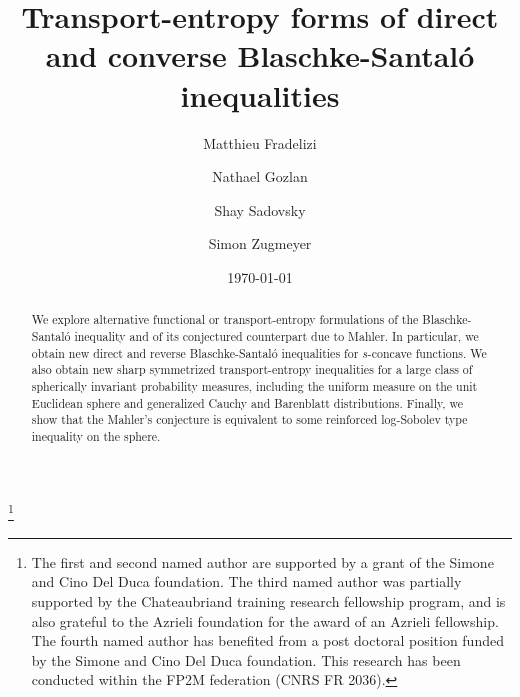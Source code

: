 \documentclass[10pt]{amsart}
\theoremstyle{definition}
\theoremstyle{remark}
\begin{document}
\title{Transport-entropy forms of direct and converse Blaschke-Santal\'o inequalities}

\begin{abstract}
We explore alternative functional or transport-entropy  formulations of the Blaschke-Santal\'o inequality and of its conjectured counterpart due to Mahler. In particular, we obtain new direct and reverse Blaschke-Santal\'o inequalities for $s$-concave functions. We also obtain new sharp symmetrized transport-entropy inequalities for a large class of spherically invariant probability measures, including the uniform measure on the unit Euclidean sphere and generalized Cauchy and Barenblatt distributions. Finally, we show that the Mahler's conjecture is equivalent to some reinforced log-Sobolev type inequality on the sphere.
\end{abstract}

\author{Matthieu Fradelizi}
\address{LAMA, Univ Gustave Eiffel, Univ Paris Est Creteil, CNRS, F-77447 Marne-la-Vall\'ee, France.}

\author{Nathael Gozlan}
\address{Université Paris Cité, CNRS, MAP5, F-75006 Paris}

\author{Shay Sadovsky}
\address{School of Mathematical Sciences, Tel Aviv University, Tel Aviv 69978, Israel}

\author{Simon Zugmeyer}
\address{UMPA UMR5669, Lyon, France}



\date{\today}

\thanks{The first and second named author are supported by a grant of the Simone and Cino Del Duca foundation. The third named author was partially supported by the Chateaubriand training research fellowship program, and is also grateful to the Azrieli foundation for the award of an Azrieli fellowship. The fourth named author has benefited from a post doctoral position funded by the Simone and Cino Del Duca foundation. This research has been conducted within the FP2M federation (CNRS FR 2036).}
\maketitle
\end{document}
